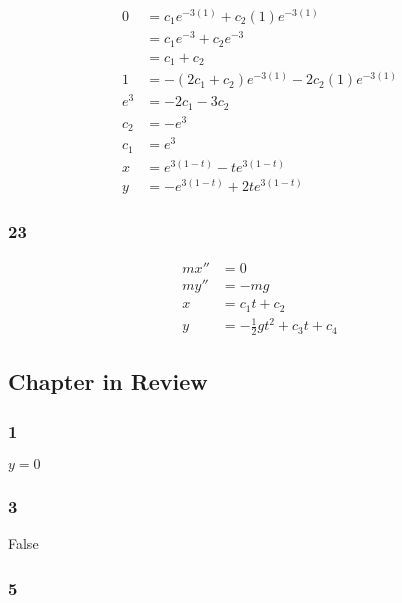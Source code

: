 \documentclass{article}
\begin{document}
\begin{align*}
  0   & = c_1 e^{-3 (1)} + c_2 (1) e^{-3 (1)}              \\
      & = c_1 e^{-3} + c_2 e^{-3}                          \\
      & = c_1 + c_2                                        \\
  1   & = -(2 c_1 + c_2) e^{-3 (1)} - 2 c_2 (1) e^{-3 (1)} \\
  e^3 & = -2 c_1 - 3 c_2                                   \\
  c_2 & = -e^3                                             \\
  c_1 & = e^3                                              \\
  x   & = e^{3 (1 - t)} - t e^{3 (1 - t)}                  \\
  y   & = -e^{3 (1 - t)} + 2 t e^{3 (1 - t)}
\end{align*}

\subsubsection{23}

\begin{align*}
  m x'' & = 0                                \\
  m y'' & = -m g                             \\
  x     & = c_1 t + c_2                      \\
  y     & = -\frac{1}{2} g t^2 + c_3 t + c_4
\end{align*}

\subsection{Chapter in Review}

\subsubsection{1}

$y = 0$

\subsubsection{3}

False

\subsubsection{5}
\end{document}
